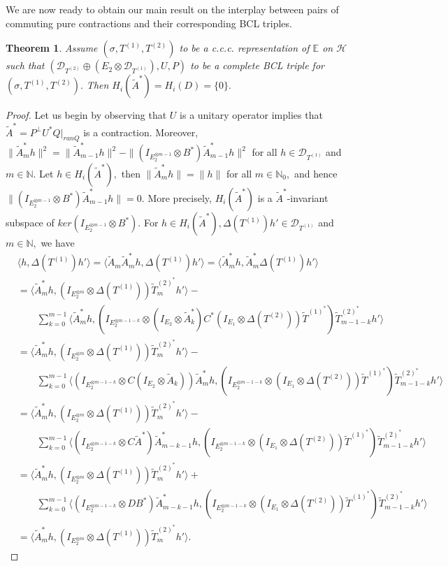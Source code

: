 \documentclass[12pt]{amsart}
\numberwithin{equation}{section}
\theoremstyle{plain}
\newtheorem{theorem}{Theorem}[section]
\newcommand{\be}{\mathbb E}
\newcommand{\ot}{\otimes}
\newcommand{\wt}{\widetilde}
\newcommand{\wT}{\wt{T}}
\begin{document}
We are now ready to obtain our main result on the interplay between pairs of commuting pure contractions and their corresponding BCL triples.
\begin{theorem}\label{JJ10}
	Assume $(\sigma, T^{(1)}, T^{(2)})$ to be a c.c.c. representation of $\be$ on $\mathcal H$ such that $(\mathcal{D}_{ T^{(2)}} \oplus (E_2\ot \mathcal{D}_{ T^{(1)}}),U,P)$ to be a complete BCL triple for $(\sigma, T^{(1)}, T^{(2)}).$ Then $H_i(\widetilde{A}^*)=H_i(D)=\{0\}.$
\end{theorem}
\begin{proof}
	Let us begin by observing that $U$ is a unitary operator implies that $\widetilde{A}^*=P^{\perp}U^*Q|_{ran{Q}}$ is a contraction. Moreover, $\|\widetilde{A}_m^*h\|^2=\|\widetilde{A}_{m-1}^*h\|^2-\|(I_{E_2^{\ot m-1}}\ot B^*)\widetilde{A}_{m-1}^*h\|^2$ for all $h\in \mathcal{D}_{ T^{(1)}}$ and $m\in \mathbb{N}.$ Let $h\in H_i(\widetilde{A}^*),$ then $\| \widetilde{A}_m^*h\|=\|h\|$ for all $m\in\mathbb{N}_0,$ and hence $\|(I_{E_2^{\ot m-1}}\ot B^*)\widetilde{A}_{m-1}^*h\|=0.$
	More precisely, $H_i(\widetilde{A}^*)$ is a $\widetilde{A}^*$-invariant subspace of $ker (I_{E_2^{\ot m-1}}\ot B^*).$ 
	For $h\in H_i(\widetilde{A}^*),\Delta(T^{(1)})h'\in \mathcal{D}_{ T^{(1)}}$ and $m\in\mathbb{N},$ we have
	\begin{align*}
		&\langle h,\Delta(T^{(1)})h'\rangle=	\langle \widetilde{A}_m\widetilde{A}_m^*h,\Delta(T^{(1)})h'\rangle=\langle \widetilde{A}_m^*h,\widetilde{A}_m^*\Delta(T^{(1)})h'\rangle\\&=\langle \widetilde{A}_m^*h,(I_{E_2^{\ot m}}\ot \Delta(T^{(1)}))\wT_m^{(2)^*}h'\rangle- \\& \quad \quad\sum_{k=0}^{m-1} \langle \widetilde{A}_m^*h,(I_{E_2^{\ot m-1-k}}\ot (I_{E_2}\ot \widetilde{A}_k^*)C^*(I_{E_1}\ot \Delta(T^{(2)}))\wT^{(1)^*})\wT_{m-1-k}^{(2)^*}h'\rangle \\&=\langle \widetilde{A}_m^*h,(I_{E_2^{\ot m}}\ot \Delta(T^{(1)}))\wT_m^{(2)^*}h'\rangle- \\& \quad \quad\sum_{k=0}^{m-1} \langle (I_{E_2^{\ot m-1-k}}\ot C(I_{E_2}\ot \widetilde{A}_k))\widetilde{A}_m^*h,(I_{E_2^{\ot m-1-k}}\ot(I_{E_1}\ot \Delta(T^{(2)}))\wT^{(1)^*})\wT_{m-1-k}^{(2)^*}h'\rangle \\&=\langle \widetilde{A}_m^*h,(I_{E_2^{\ot m}}\ot \Delta(T^{(1)}))\wT_m^{(2)^*}h'\rangle- \\& \quad \quad\sum_{k=0}^{m-1} \langle (I_{E_2^{\ot m-1-k}}\ot C\widetilde{A}^*)\widetilde{A}_{m-k-1}^*h,(I_{E_2^{\ot m-1-k}}\ot(I_{E_1}\ot \Delta(T^{(2)}))\wT^{(1)^*})\wT_{m-1-k}^{(2)^*}h'\rangle \\&=\langle \widetilde{A}_m^*h,(I_{E_2^{\ot m}}\ot \Delta(T^{(1)}))\wT_m^{(2)^*}h'\rangle+ \\& \quad \quad\sum_{k=0}^{m-1} \langle (I_{E_2^{\ot m-1-k}}\ot DB^*)\widetilde{A}_{m-k-1}^*h,(I_{E_2^{\ot m-1-k}}\ot(I_{E_1}\ot \Delta(T^{(2)}))\wT^{(1)^*})\wT_{m-1-k}^{(2)^*}h'\rangle \\&=\langle \widetilde{A}_m^*h,(I_{E_2^{\ot m}}\ot \Delta(T^{(1)}))\wT_m^{(2)^*}h'\rangle.

\end{align*}
\end{proof}
\end{document}
